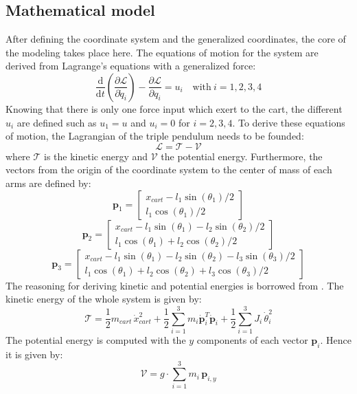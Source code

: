 \documentclass[a4paper,12pt,twoside]{article}
\begin{document}
\subsection{Mathematical model}
After defining the coordinate system and the generalized coordinates, the core of the modeling takes place here. The equations of motion for the system are derived from Lagrange's equations with a generalized force:
\begin{equation} \label{equ:Lagrange_motions}
	\frac{\text{d}}{\text{d}t} \left(\frac{\partial \mathcal{L}}{\partial \dot q_i}\right) - \frac{\partial \mathcal{L}}{\partial q_i} = u_i
	\quad \text{with}\ i=1,2,3,4
\end{equation}
Knowing that there is only one force input which exert to the cart, the different $u_i$ are defined such as $u_1 = u$ and $u_i = 0$ for $i=2,3,4$. To derive these equations of motion, the Lagrangian of the triple pendulum needs to be founded:
\begin{equation}
	\mathcal{L} = \mathcal{T} - \mathcal{V}
\end{equation}
where $\mathcal{T}$ is the kinetic energy and $\mathcal{V}$ the potential energy. Furthermore, the vectors from the origin of the coordinate system to the center of mass of each arms are defined by:
\[
	\mathbf{p}_1 =
	\begin{bmatrix}
		x_{cart} - l_1 \sin(\theta_1)/2 \\
		l_1 \cos(\theta_1)/2
	\end{bmatrix}
\]
\[
	\mathbf{p}_2 =
	\begin{bmatrix}
		x_{cart} - l_1 \sin(\theta_1) - l_2 \sin(\theta_2)/2 \\
		l_1 \cos(\theta_1) + l_2 \cos(\theta_2)/2
	\end{bmatrix}
\]
\[
	\mathbf{p}_3 =
	\begin{bmatrix}
		x_{cart} - l_1 \sin(\theta_1) - l_2 \sin(\theta_2) - l_3 \sin(\theta_3)/2 \\
		l_1 \cos(\theta_1) + l_2 \cos(\theta_2) + l_3 \cos(\theta_3)/2
	\end{bmatrix}
\]
The reasoning for deriving kinetic and potential energies is borrowed from \cite{}. The kinetic energy of the whole system is given by:
\begin{equation}
	\mathcal{T} = \frac{1}{2} m_{cart}\, \dot x_{cart}^2 +
		\frac{1}{2} \sum_{i=1}^{3} m_i \mathbf{\dot p}_i^T \mathbf{\dot p}_i +
		\frac{1}{2} \sum_{i=1}^{3} J_i\, \dot\theta_i^2
\end{equation}
The potential energy is computed with the $y$ components of each vector $\mathbf{p}_i$. Hence it is given by:
\begin{equation}
	\mathcal{V} = g \cdot \sum_{i=1}^3 m_i\, \mathbf{p}_{i,y}
\end{equation}
\end{document}

